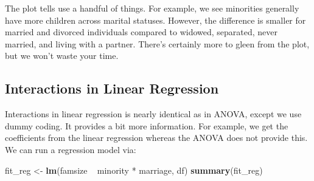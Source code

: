 \documentclass[]{tufte-book}
\newenvironment{Shaded}{}{}
\newcommand{\KeywordTok}[1]{\textcolor[rgb]{0.00,0.44,0.13}{\textbf{#1}}}
\newcommand{\StringTok}[1]{\textcolor[rgb]{0.25,0.44,0.63}{#1}}
\newcommand{\OperatorTok}[1]{\textcolor[rgb]{0.40,0.40,0.40}{#1}}
\newcommand{\NormalTok}[1]{#1}
\theoremstyle{definition}
\theoremstyle{definition}
\theoremstyle{remark}
\begin{document}
The plot tells use a handful of things. For example, we see minorities
generally have more children across marital statuses. However, the
difference is smaller for married and divorced individuals compared to
widowed, separated, never married, and living with a partner. There's
certainly more to gleen from the plot, but we won't waste your time.

\subsection*{Interactions in Linear
Regression}\label{interactions-in-linear-regression}

Interactions in linear regression is nearly identical as in ANOVA,
except we use dummy coding. It provides a bit more information. For
example, we get the coefficients from the linear regression whereas the
ANOVA does not provide this. We can run a regression model via:

\begin{Shaded}
\begin{Highlighting}[]
\NormalTok{fit_reg <-}\StringTok{ }\KeywordTok{lm}\NormalTok{(famsize }\OperatorTok{~}\StringTok{ }\NormalTok{minority }\OperatorTok{*}\StringTok{ }\NormalTok{marriage, df)}
\KeywordTok{summary}\NormalTok{(fit_reg)}
\end{Highlighting}
\end{Shaded}
\end{document}
